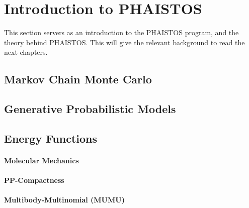 \chapter{Introduction to PHAISTOS}

This section servers as an introduction to the PHAISTOS program, and the theory behind PHAISTOS. 
This will give the relevant background to read the next chapters.

\section{Markov Chain Monte Carlo}

\section{Generative Probabilistic Models}

\section{Energy Functions}

\subsubsection{Molecular Mechanics}

\subsubsection{PP-Compactness}

\subsubsection{Multibody-Multinomial (MUMU)}


